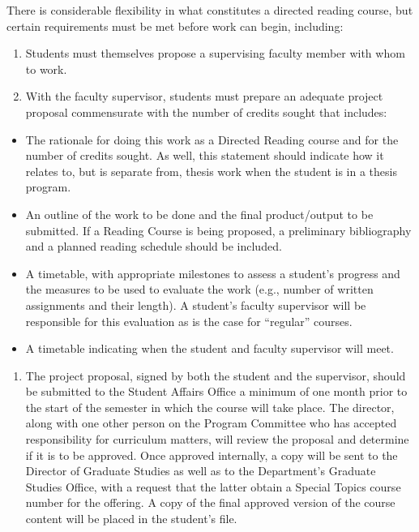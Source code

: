 \documentclass[
]{book}
\providecommand{\tightlist}{%
  \setlength{\itemsep}{0pt}\setlength{\parskip}{0pt}}
\begin{document}
There is considerable flexibility in what constitutes a directed reading course, but certain requirements must be met before work can begin, including:

\begin{enumerate}
\def\labelenumi{\arabic{enumi}.}
\item
  Students must themselves propose a supervising faculty member with whom to work.
\item
  With the faculty supervisor, students must prepare an adequate project proposal commensurate with the number of credits sought that includes:
\end{enumerate}

\begin{itemize}
\item
  The rationale for doing this work as a Directed Reading course and for the number of credits sought. As well, this statement should indicate how it relates to, but is separate from, thesis work when the student is in a thesis program.
\item
  An outline of the work to be done and the final product/output to be submitted. If a Reading Course is being proposed, a preliminary bibliography and a planned reading schedule should be included.
\item
  A timetable, with appropriate milestones to assess a student's progress and the measures to be used to evaluate the work (e.g., number of written assignments and their length). A student's faculty supervisor will be responsible for this evaluation as is the case for ``regular'' courses.
\item
  A timetable indicating when the student and faculty supervisor will meet.
\end{itemize}

\begin{enumerate}
\def\labelenumi{\arabic{enumi}.}
\setcounter{enumi}{2}
\tightlist
\item
  The project proposal, signed by both the student and the supervisor, should be submitted to the Student Affairs Office a minimum of one month prior to the start of the semester in which the course will take place. The director, along with one other person on the Program Committee who has accepted responsibility for curriculum matters, will review the proposal and determine if it is to be approved. Once approved internally, a copy will be sent to the Director of Graduate Studies as well as to the Department's Graduate Studies Office, with a request that the latter obtain a Special Topics course number for the offering. A copy of the final approved version of the course content will be placed in the student's file.
\end{enumerate}
\end{document}
